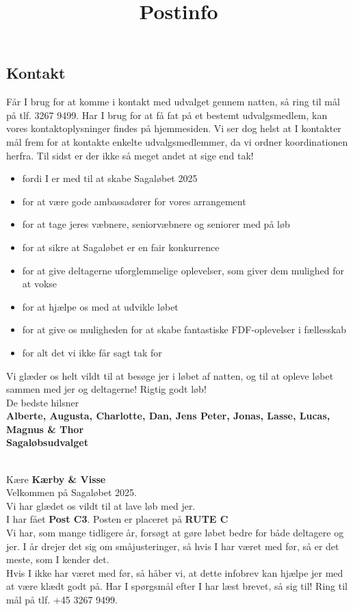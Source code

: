 \subsection{Kontakt}
Får I brug for at komme i kontakt med udvalget gennem natten, så ring til mål på tlf. 3267 9499. Har I brug for at få fat på et bestemt udvalgsmedlem, kan vores kontaktoplysninger findes på hjemmesiden. Vi ser dog helst at I kontakter mål frem for at kontakte enkelte udvalgsmedlemmer, da vi ordner koordinationen herfra.
\newline
Til sidst er der ikke så meget andet at sige end tak!\begin{itemize}
  \item fordi I er med til at skabe Sagaløbet 2025
  \item for at være gode ambassadører for vores arrangement
  \item for at tage jeres væbnere, seniorvæbnere og seniorer med på løb
  \item for at sikre at Sagaløbet er en fair konkurrence
  \item for at give deltagerne uforglemmelige oplevelser, som giver dem mulighed for at vokse
  \item for at hjælpe os med at udvikle løbet
  \item for at give os muligheden for at skabe fantastiske FDF-oplevelser i fællesskab
  \item for alt det vi ikke får sagt tak for
\end{itemize}
Vi glæder os helt vildt til at besøge jer i løbet af natten, og til at opleve løbet sammen med jer og deltagerne!
\newline
Rigtig godt løb!\\
\newline
\textcolor{søblå}{De bedste hilsner}\\
\textcolor{natblå}{\textbf{Alberte, Augusta, Charlotte, Dan, Jens Peter, Jonas, Lasse, Lucas, Magnus \& Thor}}\\
\textcolor{natblå}{\textbf{Sagaløbsudvalget}}\\
\newpage
\title{Postinfo}\\
Kære \textbf{Kærby \& Visse}\\
\newline
Velkommen på Sagaløbet 2025.\\
Vi har glædet os vildt til at lave løb med jer.\\
\newline
I har fået \textbf{Post C3}. Posten er placeret på \textbf{RUTE C}\\
Vi har, som mange tidligere år, forsøgt at gøre løbet bedre for både deltagere og jer. I år drejer det sig om småjusteringer, så hvis I har været med før, så er det meste, som I kender det.\\
\newline
Hvis I ikke har været med før, så håber vi, at dette infobrev kan hjælpe jer med at være klædt godt på. Har I spørgsmål efter I har læst brevet, så sig til! Ring til mål på tlf. +45 3267 9499.
